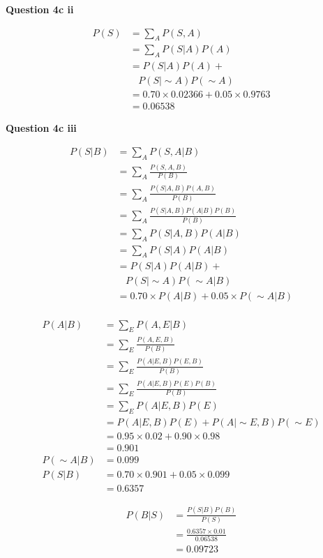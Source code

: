 \documentclass[11pt,a4paper]{report}
\begin{document}
\begin{multicols*}{2}
\noindent \textbf{Question 4c ii}

\begin{equation*}
\begin{split}
P(S) &= \sum_{A} P(S,A)\\
     &= \sum_{A} P(S|A)P(A)\\
     &=      P(S|     A)P(     A) +\\
     &\ \ \ \ P(S|\sim A)P(\sim A)\\
     &= 0.70 \times 0.02366 + 0.05 \times 0.9763\\
     &= 0.06538
\end{split}
\end{equation*}

\noindent \textbf{Question 4c iii}

\begin{equation*}
\begin{split}
P(S|B) &= \sum_{A} P(S,A|B)\\
       &= \sum_{A} \frac{P(S,A,B)}{P(B)}\\
       &= \sum_{A} \frac{P(S|A,B)P(A,B)}{P(B)}\\
       &= \sum_{A} \frac{P(S|A,B)P(A|B)P(B)}{P(B)}\\
       &= \sum_{A} P(S|A,B)P(A|B)\\
       &= \sum_{A} P(S|A)P(A|B)\\
       &=      P(S|     A)P(     A|B)+\\
       &\ \ \ \ P(S|\sim A)P(\sim A|B)\\
       &= 0.70 \times P(A|B) + 0.05 \times P(\sim A|B)\\
\end{split}
\end{equation*}

\begin{equation*}
\begin{split}
P(A|B)      &= \sum_{E} P(A,E|B)\\
            &= \sum_{E} \frac{P(A,E,B)}{P(B)}\\
            &= \sum_{E} \frac{P(A|E,B)P(E,B)}{P(B)}\\
            &= \sum_{E} \frac{P(A|E,B)P(E)P(B)}{P(B)}\\
            &= \sum_{E} P(A|E,B)P(E)\\
            &= P(A|E,B)P(E) + P(A|\sim E,B)P(\sim E)\\
            &= 0.95 \times 0.02 + 0.90 \times 0.98\\
            &= 0.901\\
P(\sim A|B) &= 0.099\\
P(S|B)      &= 0.70 \times 0.901 + 0.05 \times 0.099\\
            &= 0.6357
\end{split}
\end{equation*}

\begin{equation*}
\begin{split}
P(B|S) &= \frac{P(S|B)P(B)}{P(S)}\\
       &= \frac{0.6357 \times 0.01}{0.06538}\\
       &= 0.09723
\end{split}
\end{equation*}


\end{multicols*}
\end{document}
